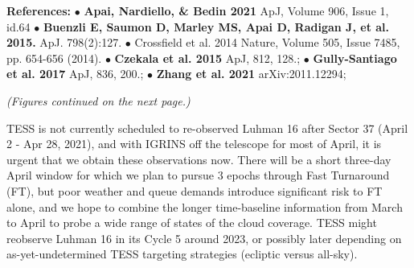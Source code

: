 \documentclass[11pt]{article}
\begin{document}
{  

\setlength{\parindent}{0cm}
\textbf{References:}
{\footnotesize $\bullet$ \textbf{Apai, Nardiello, \& Bedin 2021} ApJ, Volume 906, Issue 1, id.64 
$\bullet$ \textbf{Buenzli E, Saumon D, Marley MS, Apai D, Radigan J, et al. 2015.} ApJ. 798(2):127. 
$\bullet$ Crossfield et al. 2014 Nature, Volume 505, Issue 7485, pp. 654-656 (2014).
$\bullet$ \textbf{Czekala et al. 2015} ApJ, 812, 128.; 
$\bullet$ \textbf{Gully-Santiago et al. 2017} ApJ, 836, 200.; 
$\bullet$ \textbf{Zhang et al. 2021} arXiv:2011.12294;}
\setlength{\parindent}{1cm}

\emph{(Figures continued on the next page.)}

\clearpage


%
%
%

\expdesign

TESS is not currently scheduled to re-observed Luhman 16 after Sector 37 (April 2 - Apr 28, 2021), and with IGRINS off the telescope for most of April, it is urgent that we obtain these observations now.  There will be a short three-day April window for which we plan to pursue 3 epochs through Fast Turnaround (FT), but poor weather and queue demands introduce significant risk to FT alone, and we hope to combine the longer time-baseline information from March to April to probe a wide range of states of the cloud coverage.  TESS might reobserve Luhman 16 in its Cycle 5 around 2023, or possibly later depending on as-yet-undetermined TESS targeting strategies (ecliptic versus all-sky).

}
\end{document}
